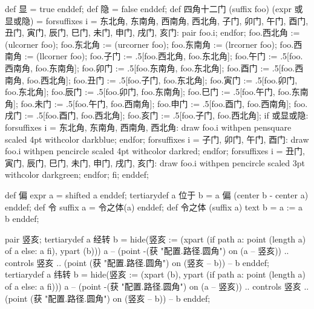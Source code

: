 \startMPinclusions[+]
def 显 = true enddef;
def 隐 = false enddef;
def 四角十二门 (suffix foo) (expr 或显或隐) = 
  forsuffixes i = 东北角, 东南角, 西南角, 西北角,
                  子门, 卯门, 午门, 酉门,
                  丑门, 寅门, 辰门, 巳门, 未门, 申门, 戌门, 亥门:
    pair foo.i;
  endfor;
  foo.西北角 := (ulcorner foo); 
  foo.东北角 := (urcorner foo);
  foo.东南角 := (lrcorner foo);
  foo.西南角 := (llcorner foo);
  foo.子门 := .5[foo.西北角, foo.东北角];
  foo.午门 := .5[foo.西南角, foo.东南角];
  foo.卯门 := .5[foo.东南角, foo.东北角];
  foo.酉门 := .5[foo.西南角, foo.西北角];
  foo.丑门 := .5[foo.子门, foo.东北角];
  foo.寅门 := .5[foo.卯门, foo.东北角];
  foo.辰门 := .5[foo.卯门, foo.东南角];
  foo.巳门 := .5[foo.午门, foo.东南角];
  foo.未门 := .5[foo.午门, foo.西南角];
  foo.申门 := .5[foo.酉门, foo.西南角];
  foo.戌门 := .5[foo.酉门, foo.西北角];
  foo.亥门 := .5[foo.子门, foo.西北角];
  if 或显或隐:
    forsuffixes i = 东北角, 东南角, 西南角, 西北角:
      draw foo.i withpen pensquare scaled 4pt withcolor darkblue;
    endfor;
    forsuffixes i = 子门, 卯门, 午门, 酉门:
      draw foo.i withpen pencircle scaled 4pt withcolor darkred;
    endfor;
    forsuffixes i = 丑门, 寅门, 辰门, 巳门, 未门, 申门, 戌门, 亥门:
      draw foo.i
        withpen pencircle scaled 3pt withcolor darkgreen;
    endfor;
  fi;
enddef;
\stopMPinclusions

\startMPinclusions[+]
def 偏 expr a = shifted a enddef;
tertiarydef a 位于 b = a 偏 (center b - center a) enddef;
def 令 suffix a = 令之体(a) enddef;
def 令之体 (suffix a) text b = a := a b enddef;
\stopMPinclusions

\startMPinclusions[+]
pair 竖亥;
tertiarydef a 经转 b =
  hide(竖亥 := (xpart (if path a: point (length a) of a else: a fi), ypart (b)))
  a -- (point -(获 "配置.路径.圆角") on (a -- 竖亥))
    .. controls 竖亥 .. (point (获 "配置.路径.圆角") on (竖亥 -- b)) -- b
enddef;
tertiarydef a 纬转 b =
  hide(竖亥 := (xpart (b), ypart (if path a: point (length a) of a else: a fi)))
  a -- (point -(获 "配置.路径.圆角") on (a -- 竖亥))
    .. controls 竖亥 .. (point (获 "配置.路径.圆角") on (竖亥 -- b)) -- b
enddef;
\stopMPinclusions

